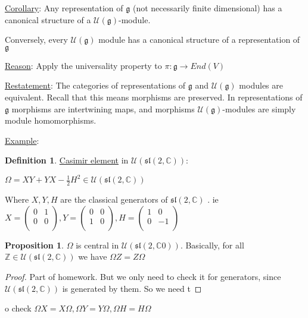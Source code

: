 \documentclass{article}
\theoremstyle{definition}
\newtheorem{definition}{Definition}
\newtheorem{proposition}{Proposition}
\begin{document}
\underline{Corollary}: Any representation of \(\mathfrak{g}\) (not necessarily finite dimensional) has a canonical structure of a \(\mathcal{U}(\mathfrak{g})\)-module.

Conversely, every \(\mathcal{U}(\mathfrak{g})\) module has a canonical structure of a representation of \(\mathfrak{g}\) 

\underline{Reason}: Apply the universality property to \(\pi: \mathfrak{g} \to End(V) \) 

\underline{Restatement}: The categories of representations of \(\mathfrak{g} \) and \(\mathcal{U} (\mathfrak{g} )\) modules are equivalent. Recall that this means morphisms are preserved. In representations of \(\mathfrak{g} \) morphisms are intertwining maps, and morphisms \(\mathcal{U} (\mathfrak{g} )\)-modules are simply module homomorphisms.

\underline{Example}:

\begin{definition}
    \underline{Casimir element} in \(\mathcal{U} (\mathfrak{sl} (2,\mathbb{C} ))\):

    \(\Omega = XY + YX -\frac{1}{2} H^2 \in \mathcal{U} (\mathfrak{sl} (2,\mathbb{C}))\) 

    Where \(X,Y,H\) are the classical generators of \(\mathfrak{sl} (2,\mathbb{C} )\) . ie \(X = \begin{pmatrix}
        0 &  1 \\
        0 &  0 \\
    \end{pmatrix}, Y = \begin{pmatrix}
        0 &  0 \\
        1 &  0 \\
    \end{pmatrix}, H = \begin{pmatrix}
        1 &  0 \\
        0 &  -1 \\
    \end{pmatrix}\) 

\end{definition}

\begin{proposition}
    \(\Omega\) is central in \(\mathcal{U} (\mathfrak{sl} (2,\mathbb{C} 0))\). Basically, for all \(\mathbb{Z}\in \mathcal{U} (\mathfrak{sl}(2,\mathbb{C} ) )\) we have \(\Omega Z = Z \Omega\)
\end{proposition}

\begin{proof}
    Part of homework. But we only need to check it for generators, since \(\mathcal{U} (\mathfrak{sl}(2,\mathbb{C}) )\) is generated by them. So we need t 
\end{proof}o check \(\Omega X = X \Omega , \Omega Y = Y \Omega , \Omega H = H \Omega\) 
\end{document}
